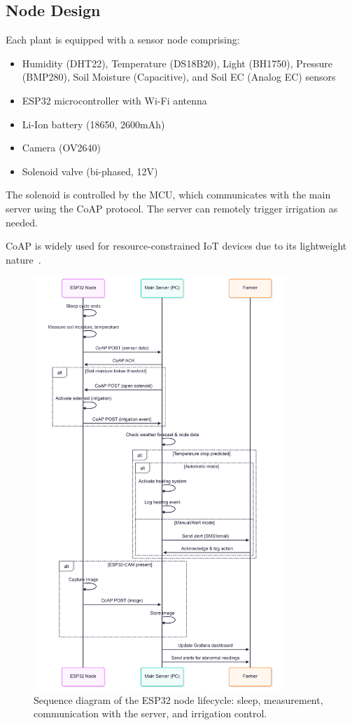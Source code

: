 \documentclass[12pt,a4paper]{article}
\begin{document}
\subsection{Node Design}
Each plant is equipped with a sensor node comprising:
\begin{itemize}
    \item Humidity (DHT22), Temperature (DS18B20), Light (BH1750), Pressure (BMP280), Soil Moisture (Capacitive), and Soil EC (Analog EC) sensors
    \item ESP32 microcontroller with Wi-Fi antenna
    \item Li-Ion battery (18650, 2600mAh)
    \item Camera (OV2640)
    \item Solenoid valve (bi-phased, 12V)
\end{itemize}
The solenoid is controlled by the MCU, which communicates with the main server using the CoAP protocol. The server can remotely trigger irrigation as needed.

CoAP is widely used for resource-constrained IoT devices due to its lightweight nature~\cite{CoAPRFC}.

\begin{figure}[H]
    \centering
    \includegraphics[width=0.85\textwidth]{images/nodeLifeCycleSequenceDiagram.png}
    \caption{Sequence diagram of the ESP32 node lifecycle: sleep, measurement, communication with the server, and irrigation control.}
    \label{fig:node-lifecycle}
\end{figure}
\end{document}
